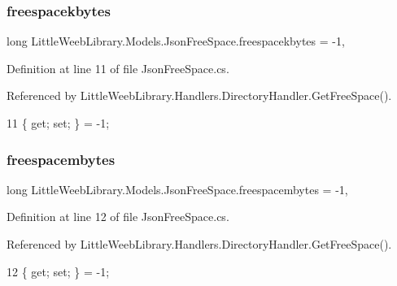 \subsubsection{\texorpdfstring{freespacekbytes}{freespacekbytes}}
{\footnotesize\ttfamily long Little\+Weeb\+Library.\+Models.\+Json\+Free\+Space.\+freespacekbytes = -\/1\hspace{0.3cm}{\ttfamily [get]}, {\ttfamily [set]}}



Definition at line 11 of file Json\+Free\+Space.\+cs.



Referenced by Little\+Weeb\+Library.\+Handlers.\+Directory\+Handler.\+Get\+Free\+Space().


\begin{DoxyCode}
11 \{ \textcolor{keyword}{get}; \textcolor{keyword}{set}; \} = -1;
\end{DoxyCode}
\mbox{\label{class_little_weeb_library_1_1_models_1_1_json_free_space_ac331b31dba1337829ebc86ef88164e57}} 
\subsubsection{\texorpdfstring{freespacembytes}{freespacembytes}}
{\footnotesize\ttfamily long Little\+Weeb\+Library.\+Models.\+Json\+Free\+Space.\+freespacembytes = -\/1\hspace{0.3cm}{\ttfamily [get]}, {\ttfamily [set]}}



Definition at line 12 of file Json\+Free\+Space.\+cs.



Referenced by Little\+Weeb\+Library.\+Handlers.\+Directory\+Handler.\+Get\+Free\+Space().


\begin{DoxyCode}
12 \{ \textcolor{keyword}{get}; \textcolor{keyword}{set}; \} = -1;
\end{DoxyCode}
\mbox{\label{class_little_weeb_library_1_1_models_1_1_json_free_space_a9c3ae588d489e377de5bd608b69a5e75}} 
